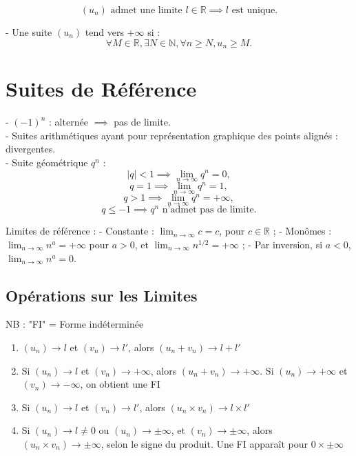 \documentclass[a4paper,10pt]{article}
\begin{document}
\[
(u_n) \text{ admet une limite } l \in \mathbb{R} \implies l \text{ est unique.}
\]


- Une suite $(u_n)$ tend vers $+\infty$ si :
\[
\forall M \in \mathbb{R}, \exists N \in \mathbb{N}, \forall n \geq N, u_n \geq M.
\]

\section*{Suites de Référence}

- \( (-1)^n \) : alternée \(\implies\) pas de limite. \\
- Suites arithmétiques ayant pour représentation graphique des points alignés : divergentes. \\

- Suite géométrique \( q^n \) :
\[
|q| < 1 \implies \lim_{n \to \infty} q^n = 0,
\]
\[
q = 1 \implies \lim_{n \to \infty} q^n = 1,
\]
\[
q > 1 \implies \lim_{n \to \infty} q^n = +\infty,
\]
\[
q \leq -1 \implies q^n \text{ n'admet pas de limite.}
\]

Limites de référence :
- Constante : \( \lim_{n \to \infty} c = c \), pour \( c \in \mathbb{R} \) ;
- Monômes : \( \lim_{n \to \infty} n^a = +\infty \) pour \( a > 0 \), et \( \lim_{n \to \infty} n^{1/2} = +\infty \) ;
- Par inversion, si \( a < 0 \), \( \lim_{n \to \infty} n^a = 0 \).

\subsection*{Opérations sur les Limites}

NB : "FI" = Forme indéterminée

\begin{enumerate}
	\item \( (u_n) \to l \) et \( (v_n) \to l' \), alors \( (u_n + v_n) \to l + l' \)
	\item Si \( (u_n) \to l \) et \( (v_n) \to +\infty \), alors \( (u_n + v_n) \to +\infty \). Si \( (u_n) \to +\infty \) et \( (v_n) \to -\infty \), on obtient une FI
	\item Si \( (u_n) \to l \) et \( (v_n) \to l' \), alors \( (u_n \times v_n) \to l \times l' \)
	\item Si \( (u_n) \to l \neq 0 \) ou \( (u_n) \to \pm\infty \), et \( (v_n) \to \pm\infty \), alors \( (u_n \times v_n) \to \pm\infty \), selon le signe du produit. Une FI apparaît pour \( 0 \times \pm\infty \)
\end{enumerate}
\end{document}
